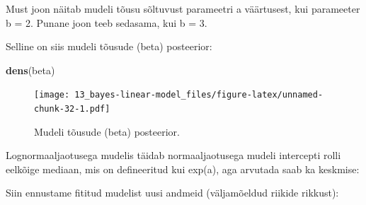 \documentclass[]{book}
\newenvironment{Shaded}{\begin{snugshade}}{\end{snugshade}}
\newcommand{\CommentTok}[1]{\textcolor[rgb]{0.56,0.35,0.01}{\textit{#1}}}
\newcommand{\DecValTok}[1]{\textcolor[rgb]{0.00,0.00,0.81}{#1}}
\newcommand{\KeywordTok}[1]{\textcolor[rgb]{0.13,0.29,0.53}{\textbf{#1}}}
\newcommand{\NormalTok}[1]{#1}
\newcommand{\OperatorTok}[1]{\textcolor[rgb]{0.81,0.36,0.00}{\textbf{#1}}}
\newcommand{\StringTok}[1]{\textcolor[rgb]{0.31,0.60,0.02}{#1}}
\begin{document}
Must joon näitab mudeli tõusu sõltuvust parameetri a väärtusest, kui parameeter b = 2. Punane joon teeb sedasama, kui b = 3.

Selline on siis mudeli tõusude (beta) posteerior:

\begin{Shaded}
\end{Shaded}

\begin{Shaded}
\begin{Highlighting}[]
\KeywordTok{dens}\NormalTok{(beta)}
\end{Highlighting}
\end{Shaded}

\begin{figure}
\centering
\texttt{[image: 13\_bayes-linear-model\_files/figure-latex/unnamed-chunk-32-1.pdf]}
\caption{\label{fig:unnamed-chunk-32}Mudeli tõusude (beta) posteerior.}
\end{figure}

Lognormaaljaotusega mudelis täidab normaaljaotusega mudeli intercepti rolli eelkõige mediaan, mis on defineeritud kui exp(a), aga arvutada saab ka keskmise:

\begin{Shaded}
\end{Shaded}

Siin ennustame fititud mudelist uusi andmeid (väljamõeldud riikide rikkust):
\end{document}
